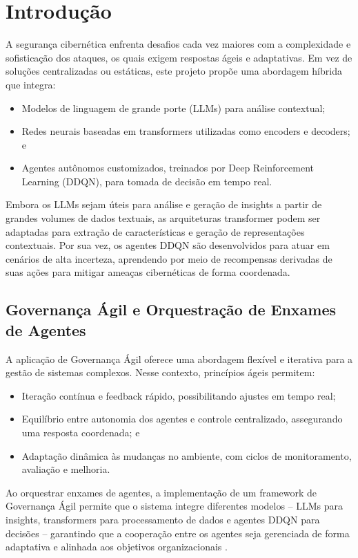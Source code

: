\documentclass[article,12pt,a4paper]{abntex2}
\begin{document}
\imprimircapa

\textual
\section{Introdução}
A segurança cibernética enfrenta desafios cada vez maiores com a complexidade e sofisticação dos ataques, os quais exigem respostas ágeis e adaptativas. Em vez de soluções centralizadas ou estáticas, este projeto propõe uma abordagem híbrida que integra:
\begin{itemize}
    \item Modelos de linguagem de grande porte (LLMs) para análise contextual;
    \item Redes neurais baseadas em transformers utilizadas como encoders e decoders; e
    \item Agentes autônomos customizados, treinados por Deep Reinforcement Learning (DDQN), para tomada de decisão em tempo real.
\end{itemize}
Embora os LLMs sejam úteis para análise e geração de insights a partir de grandes volumes de dados textuais, as arquiteturas transformer podem ser adaptadas para extração de características e geração de representações contextuais. Por sua vez, os agentes DDQN são desenvolvidos para atuar em cenários de alta incerteza, aprendendo por meio de recompensas derivadas de suas ações para mitigar ameaças cibernéticas de forma coordenada. 

\subsection{Governança Ágil e Orquestração de Enxames de Agentes}
A aplicação de Governança Ágil oferece uma abordagem flexível e iterativa para a gestão de sistemas complexos. Nesse contexto, princípios ágeis permitem:
\begin{itemize}
  \item Iteração contínua e feedback rápido, possibilitando ajustes em tempo real;
  \item Equilíbrio entre autonomia dos agentes e controle centralizado, assegurando uma resposta coordenada; e
  \item Adaptação dinâmica às mudanças no ambiente, com ciclos de monitoramento, avaliação e melhoria.
\end{itemize}
Ao orquestrar enxames de agentes, a implementação de um framework de Governança Ágil permite que o sistema integre diferentes modelos – LLMs para insights, transformers para processamento de dados e agentes DDQN para decisões – garantindo que a cooperação entre os agentes seja gerenciada de forma adaptativa e alinhada aos objetivos organizacionais \cite{agilegov2020,agilegov2021}.
\end{document}

